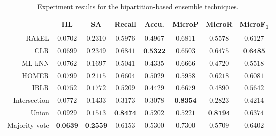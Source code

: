 \begin{table*}[ht]
	\begin{center}
	        \label{tab:bipartition-table}
		\begin{tabular}{rccccccc}
		\toprule
			 & HL & SA & Recall & Accu. & MicroP & MicroR & MicroF\textsubscript{1}\\
			\midrule
			RAkEL & $0.0702$ & $0.2310$ & $0.5976$ & $0.4967$ & $0.6811$ & $0.5578$ & $0.6127$\\
			CLR & $0.0699$ & $0.2349$ & $0.6841$ & $\textbf{0.5322}$ & $0.6503$ & $0.6475$ & $\textbf{0.6485}$\\
			ML-kNN & $0.0762$ & $0.1697$ & $0.5041$ & $0.4335$ & $0.6666$ & $0.4720$ & $0.5518$\\
			HOMER & $0.0799$ & $0.2115$ & $0.6604$ & $0.5029$ & $0.5958$ & $0.6218$ & $0.6081$\\
			IBLR & $0.0752$ & $0.1772$ & $0.5209$ & $0.4429$ & $0.6679$ & $0.4890$ & $0.5642$\\
			Intersection & $0.0772$ & $0.1433$ & $0.3173$ & $0.3078$ & $\textbf{0.8354}$ & $0.2823$ & $0.4214$\\
			Union & $0.0929$ & $0.1513$ & $\textbf{0.8474}$ & $0.5202$ & $0.5221$ & $\textbf{0.8194}$ & $0.6374$\\
			Majority vote & $\textbf{0.0639}$ & $\textbf{0.2559}$ & $0.6153$ & $0.5300$ & $0.7300$ & $0.5709$ & $0.6402$\\
		\bottomrule
		\end{tabular}
                \caption{Experiment results for the bipartition-based ensemble techniques.}
	\end{center}
\end{table*}

